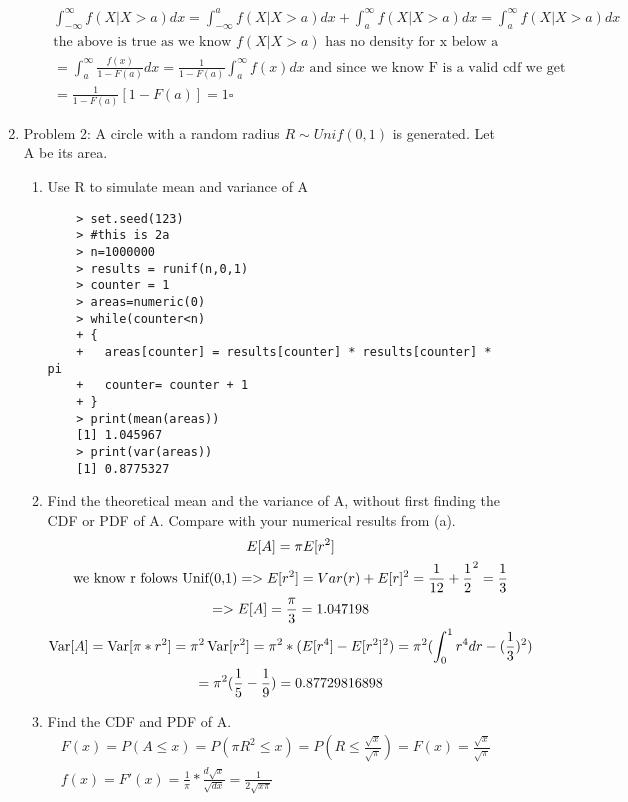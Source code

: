 \documentclass[11pt]{article}
\newcommand{\var}{\mathop{\rm Var}}
\begin{document}
\begin{enumerate}
\begin{enumerate}
\begin{gather}
	\int_{-\infty}^{\infty} f(X|X>a)dx = \int_{-\infty}^{a} f(X|X>a)dx + \int_{a}^{\infty} f(X|X>a)dx = \int_{a}^{\infty} f(X|X>a)dx\\
	\text{the above is true as we know $f(X|X>a)$ has no density for x below a}
	\\
	=\int_{a}^{\infty} \frac{f(x)}{1-F(a)}dx = \frac{1}{1-F(a)}\int_{a}^{\infty} f(x)dx \text{ and since we know F is a valid cdf we get }\\
	= \frac{1}{1-F(a)}[1 -F(a)] = 1 \square 
	\end{gather}
\end{enumerate}
\item Problem 2: A circle with a random radius $R \sim Unif(0,1)$ is generated. Let A be its area.
\\
\begin{enumerate}
	\item Use R to simulate mean and variance of A
	\\
	\begin{verbatim}
	> set.seed(123)
	> #this is 2a
	> n=1000000
	> results = runif(n,0,1)
	> counter = 1
	> areas=numeric(0)
	> while(counter<n)
	+ {
	+   areas[counter] = results[counter] * results[counter] * pi
	+   counter= counter + 1
	+ }
	> print(mean(areas))
	[1] 1.045967
	> print(var(areas))
	[1] 0.8775327
	\end{verbatim}
	\item Find the theoretical mean and the variance of A, without first finding the CDF or PDF of A. Compare
	with your numerical results from (a).
	\begin{gather}
	E[A] = \pi E[r^2]\\
	\text{we know r folows Unif(0,1)} => E[r^2] = Var(r) + E[r]^2 = \frac{1}{12} + \frac{1}{2}^2 = \frac{1}{3}\\
	=> E[A] = \frac{\pi}{3} = 1.047198\\
	\var[A] = \var[\pi * r^2] = \pi^2\var[r^2] = \pi^2 * (E[r^4]-E[r^2]^2) = 
	\pi^2 (\int_{0}^{1}r^4 dr -(\frac{1}{3})^2) \\
	= \pi^2 (\frac{1}{5} -\frac{1}{9}) = 0.87729816898 
	\end{gather}
	\item Find the CDF and PDF of A.
	\begin{gather}
	F(x) = P(A \le x) = P(\pi R^2 \le x) = P(R \le \frac{\sqrt{x}}{\sqrt{\pi}})= F(x) = \frac{\sqrt{x}}{\sqrt{\pi}}\\
	f(x) = F'(x) = \frac{1}{\pi} * \frac{d\sqrt{x}}{\sqrt{dx}} = \frac{1}{2\sqrt{x \pi}}
	\\

\end{gather}
\end{enumerate}
\end{enumerate}
\end{document}
